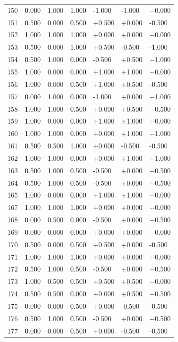 \documentclass[11pt]{article}
\begin{document}
{\begin{longtable}[]{@{}lllllll@{}}
150 & 0.000 & 1.000 & 1.000 & -1.000 & -1.000 & +0.000 \\
151 & 0.500 & 0.000 & 0.500 & +0.500 & +0.000 & -0.500 \\
152 & 1.000 & 1.000 & 1.000 & +0.000 & +0.000 & +0.000 \\
153 & 0.500 & 0.000 & 1.000 & +0.500 & -0.500 & -1.000 \\
154 & 0.500 & 1.000 & 0.000 & -0.500 & +0.500 & +1.000 \\
155 & 1.000 & 0.000 & 0.000 & +1.000 & +1.000 & +0.000 \\
156 & 1.000 & 0.000 & 0.500 & +1.000 & +0.500 & -0.500 \\
157 & 0.000 & 1.000 & 0.000 & -1.000 & +0.000 & +1.000 \\
158 & 1.000 & 1.000 & 0.500 & +0.000 & +0.500 & +0.500 \\
159 & 1.000 & 0.000 & 0.000 & +1.000 & +1.000 & +0.000 \\
160 & 1.000 & 1.000 & 0.000 & +0.000 & +1.000 & +1.000 \\
161 & 0.500 & 0.500 & 1.000 & +0.000 & -0.500 & -0.500 \\
162 & 1.000 & 1.000 & 0.000 & +0.000 & +1.000 & +1.000 \\
163 & 0.500 & 1.000 & 0.500 & -0.500 & +0.000 & +0.500 \\
164 & 0.500 & 1.000 & 0.500 & -0.500 & +0.000 & +0.500 \\
165 & 1.000 & 0.000 & 0.000 & +1.000 & +1.000 & +0.000 \\
167 & 1.000 & 1.000 & 1.000 & +0.000 & +0.000 & +0.000 \\
168 & 0.000 & 0.500 & 0.000 & -0.500 & +0.000 & +0.500 \\
169 & 0.000 & 0.000 & 0.000 & +0.000 & +0.000 & +0.000 \\
170 & 0.500 & 0.000 & 0.500 & +0.500 & +0.000 & -0.500 \\
171 & 1.000 & 1.000 & 1.000 & +0.000 & +0.000 & +0.000 \\
172 & 0.500 & 1.000 & 0.500 & -0.500 & +0.000 & +0.500 \\
173 & 1.000 & 0.500 & 0.500 & +0.500 & +0.500 & +0.000 \\
174 & 0.500 & 0.500 & 0.000 & +0.000 & +0.500 & +0.500 \\
175 & 0.000 & 0.000 & 0.500 & +0.000 & -0.500 & -0.500 \\
176 & 0.500 & 1.000 & 0.500 & -0.500 & +0.000 & +0.500 \\
177 & 0.000 & 0.000 & 0.500 & +0.000 & -0.500 & -0.500 \\

\end{longtable}}
\end{document}
